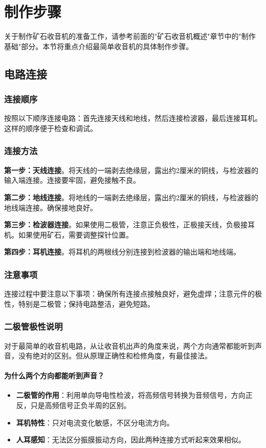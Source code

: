 \documentclass[12pt,UTF8]{ctexbook}
\begin{document}
\section{制作步骤}

关于制作矿石收音机的准备工作，请参考前面的"矿石收音机概述"章节中的"制作基础"部分。本节将重点介绍最简单收音机的具体制作步骤。

\subsection{电路连接}

\subsubsection{连接顺序}
按照以下顺序连接电路：首先连接天线和地线，然后连接检波器，最后连接耳机。这样的顺序便于检查和调试。

\subsubsection{连接方法}
\textbf{第一步：天线连接}。将天线的一端剥去绝缘层，露出约2厘米的铜线，与检波器的输入端连接。连接要牢固，避免接触不良。

\textbf{第二步：地线连接}。将地线的一端剥去绝缘层，露出约2厘米的铜线，与检波器的地线端连接。确保接地良好。

\textbf{第三步：检波器连接}。如果使用二极管，注意正负极性，正极接天线，负极接耳机。如果使用矿石，需要调整探针位置。

\textbf{第四步：耳机连接}。将耳机的两根线分别连接到检波器的输出端和地线端。

\subsubsection{注意事项}
连接过程中要注意以下事项：确保所有连接点接触良好，避免虚焊；注意元件的极性，特别是二极管；保持电路整洁，避免短路。

\subsubsection{二极管极性说明}

对于最简单的收音机电路，从让收音机出声的角度来说，两个方向通常都能听到声音，没有绝对的区别。但从原理正确性和检修角度，有最佳接法。

\paragraph{为什么两个方向都能听到声音？}
\begin{itemize}
  \item \textbf{二极管的作用}：利用单向导电性检波，将高频信号转换为音频信号，方向正反，只是高频信号正负半周的区别。
  \item \textbf{耳机特性}：只对电流变化敏感，不区分电流方向。
  \item \textbf{人耳感知}：无法区分振膜振动方向，因此两种连接方式听起来效果相似。
\end{itemize}
\end{document}
